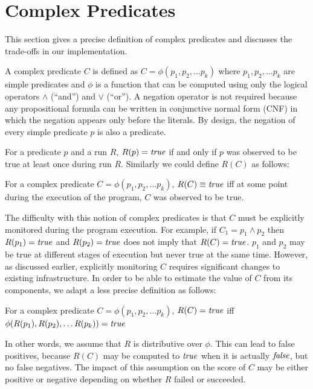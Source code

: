 
\section{Complex Predicates}
\label{sec-complex-preds}
This section gives a precise definition of complex predicates and discusses the trade-offs in our implementation.

A complex predicate $C$ is defined as $C = \phi(p_1, p_2, \ldots p_k)$ where $p_1, p_2, \ldots p_k$ are simple predicates and $\phi$ is a function that can be computed using only the logical operators $\wedge$ (``and'') and $\vee$ (``or'').  A negation operator is not required because any propositional formula can be written in conjunctive normal form (CNF) in which the negation appears only before the literals.  By design, the negation of every simple predicate $p$ is also a predicate.

For a predicate $p$ and a run $R$, $R(p) = \mathit{true}$ if and only if $p$ was observed to be true at least once during run $R$.  Similarly we could define $R(C)$ as follows:
\begin{defn}
\label{dfn1}
For a complex predicate $C = \phi(p_1, p_2, \ldots p_k)$, $R(C) \equiv \mathit{true}$ iff at some point during the execution of the program, $C$ was observed to be true.
\end{defn}

The difficulty with this notion of complex predicates is that $C$ must be explicitly monitored during the program execution.  For example, if $C_1 = p_1 \wedge p_2$ then $R(p_1) = \mathit{true}$ and $R(p_2) = \mathit{true}$ does not imply that $R(C) = \mathit{true}$.  $p_1$ and $p_2$ may be true at different stages of execution but never true at the same time.  However, as discussed earlier, explicitly monitoring $C$ requires significant changes to existing infrastructure.  In order to be able to estimate the value of $C$ from its components, we adapt a less precise definition as follows:
\begin{defn}
\label{dfn2}
For a complex predicate $C = \phi(p_1, p_2, \ldots p_k)$, $R(C) = \mathit{true}$ iff $\phi(R(p_1), R(p_2), \ldots R(p_k)) = \mathit{true}$
\end{defn}

In other words, we assume that $R$ is distributive over $\phi$.  This can lead to false positives, because $R(C)$ may be computed to $\mathit{true}$ when it is actually $\mathit{false}$, but no false negatives.  The impact of this assumption on the score of $C$ may be either positive or negative depending on whether $R$ failed or succeeded.

